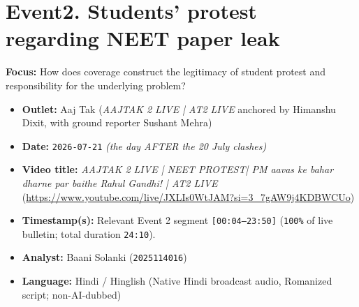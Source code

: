 \documentclass[10pt,a4paper]{article}
\begin{document}
\section*{Event2. Students' protest regarding NEET paper leak}
\textbf{Focus:} How does coverage construct the legitimacy of student protest and responsibility for the underlying problem?

\begin{itemize}[leftmargin=1.5em, itemsep=3pt, topsep=4pt]
  \item \textbf{Outlet:} Aaj Tak (\textit{AAJTAK 2 LIVE | AT2 LIVE} anchored by Himanshu Dixit, with ground reporter Sushant Mehra)
  \item \textbf{Date:} \texttt{2026-07-21} \textit{(the day AFTER the 20 July clashes)}
  \item \textbf{Video title:} \textit{AAJTAK 2 LIVE | NEET PROTEST| PM aavas ke bahar dharne par baithe Rahul Gandhi! | AT2 LIVE} (\url{https://www.youtube.com/live/JXLIs0WtJAM?si=3_7gAW9j4KDBWCUo})
  \item \textbf{Timestamp(s):} Relevant Event 2 segment \texttt{[00:04--23:50]} (\texttt{100\%} of live bulletin; total duration \texttt{24:10}).
  \item \textbf{Analyst:} Baani Solanki (\texttt{2025114016})
  \item \textbf{Language:} Hindi / Hinglish (Native Hindi broadcast audio, Romanized script; non-AI-dubbed)
\end{itemize}
\end{document}
